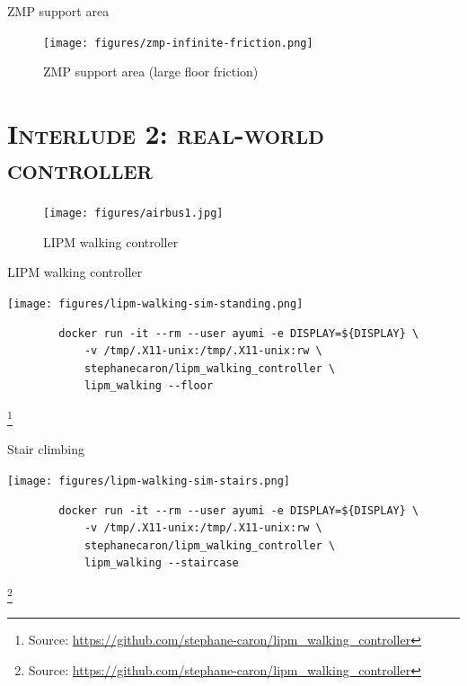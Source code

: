 \documentclass[9pt, aspectratio=43]{beamer}
\newcommand\blfootnote[1]{%
  \begingroup
  \renewcommand\thefootnote{}%
  \footnote{#1}%
  \addtocounter{footnote}{-1}%
  \endgroup
}
\begin{document}
\begin{frame}{ZMP support area}
    \begin{figure}
        \centering
        \texttt{[image: figures/zmp-infinite-friction.png]}
        \caption{ZMP support area (large floor friction)}
    \end{figure}
\end{frame}


\section*{\textsc{Interlude 2: real-world controller}}

\begin{frame}
    \begin{figure}
        \centering
        \texttt{[image: figures/airbus1.jpg]}
        \caption{LIPM walking controller}
    \end{figure}
\end{frame}


\begin{frame}[fragile]{LIPM walking controller}
    \begin{center}
        \texttt{[image: figures/lipm-walking-sim-standing.png]}
    \end{center}
    \begin{verbatim}
        docker run -it --rm --user ayumi -e DISPLAY=${DISPLAY} \
            -v /tmp/.X11-unix:/tmp/.X11-unix:rw \
            stephanecaron/lipm_walking_controller \
            lipm_walking --floor
    \end{verbatim}
    \blfootnote{
        Source: \url{https://github.com/stephane-caron/lipm_walking_controller}
    }
\end{frame}

\begin{frame}[fragile]{Stair climbing}
    \begin{center}
        \texttt{[image: figures/lipm-walking-sim-stairs.png]}
    \end{center}
    \begin{verbatim}
        docker run -it --rm --user ayumi -e DISPLAY=${DISPLAY} \
            -v /tmp/.X11-unix:/tmp/.X11-unix:rw \
            stephanecaron/lipm_walking_controller \
            lipm_walking --staircase
    \end{verbatim}
    \blfootnote{
        Source: \url{https://github.com/stephane-caron/lipm_walking_controller}
    }
\end{frame}
\end{document}
